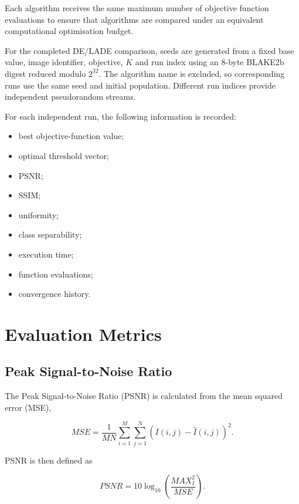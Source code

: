 \documentclass[review]{elsarticle}
\begin{document}
Each algorithm receives the same maximum number of objective function
evaluations to ensure that algorithms are compared under an equivalent
computational optimisation budget.

For the completed DE/LADE comparison, seeds are generated from a fixed
base value, image identifier, objective, $K$ and run index using an
8-byte BLAKE2b digest reduced modulo $2^{32}$. The algorithm name is
excluded, so corresponding runs use the same seed and initial population.
Different run indices provide independent pseudorandom streams.

For each independent run, the following information is recorded:

\begin{itemize}
    \item best objective-function value;
    \item optimal threshold vector;
    \item PSNR;
    \item SSIM;
    \item uniformity;
    \item class separability;
    \item execution time;
    \item function evaluations;
    \item convergence history.
\end{itemize}





\section{Evaluation Metrics}
\label{sec:metrics}


\subsection{Peak Signal-to-Noise Ratio}

The Peak Signal-to-Noise Ratio (PSNR) is calculated from the mean
squared error (MSE),

\begin{equation}
MSE =
\frac{1}{MN}
\sum_{i=1}^{M}
\sum_{j=1}^{N}
\left(
I(i,j)-\hat{I}(i,j)
\right)^2.
\end{equation}

PSNR is then defined as

\begin{equation}
PSNR =
10\log_{10}
\left(
\frac{MAX_I^2}{MSE}
\right).
\end{equation}
\end{document}
